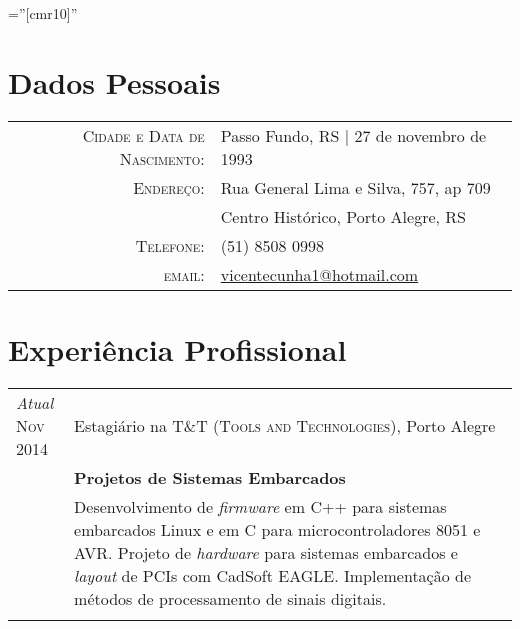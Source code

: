 \documentclass[a4paper,10pt]{article} %
\begin{document}
\pagestyle{empty} %

\font\fb=''[cmr10]'' %


\par{\bigskip\par} %

\section{Dados Pessoais}

\begin{tabular}{rl}
\textsc{Cidade e Data de Nascimento:} & Passo Fundo, RS  | 27 de novembro de 1993 \\
\textsc{Endereço:} & Rua General Lima e Silva, 757, ap 709 \\ &Centro Histórico, Porto Alegre, RS \\
\textsc{Telefone:} & (51) 8508 0998\\
\textsc{email:} & \href{mailto:vicentecunha1@hotmail.com}{vicentecunha1@hotmail.com}
\end{tabular}


\section{Experiência Profissional}

\begin{tabular}{p{1.5cm}|p{12cm}}

\pbox{20cm}{\emph{Atual}\\\textsc{Nov} 2014} & Estagiário na \textsc{T\&T (Tools and Technologies)}, Porto Alegre \\
& \textbf{Projetos de Sistemas Embarcados}\\ 
& \footnotesize{Desenvolvimento de \textit{firmware} em C++ para sistemas embarcados Linux e em C para microcontroladores 8051 e AVR. Projeto de \textit{hardware} para sistemas embarcados e \textit{layout} de PCIs com CadSoft EAGLE. Implementação de métodos de processamento de sinais digitais.}\\
\multicolumn{2}{c}{} \\

\end{tabular}
\end{document}
